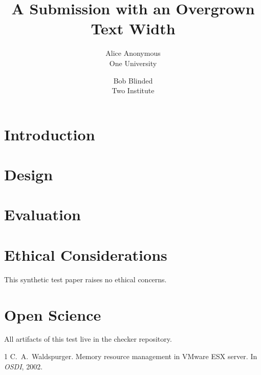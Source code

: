 \documentclass[letterpaper,twocolumn,10pt]{article}
\date{}
\title{\Large \bf A Submission with an Overgrown Text Width}
\author{{\rm Alice Anonymous}\\One University \and {\rm Bob Blinded}\\Two Institute}
\begin{document}
\maketitle

\begin{abstract}
\lipsum[1][1-5]
\end{abstract}

\section{Introduction}
\lipsum[2-20]

\section{Design}
\lipsum[21-45]

\section{Evaluation}
\lipsum[46-70]

\appendix
\section*{Ethical Considerations}
This synthetic test paper raises no ethical concerns.

\section*{Open Science}
All artifacts of this test live in the checker repository.

\begin{thebibliography}{1}
 C.~A.\ Waldspurger. Memory resource management in VMware ESX
  server. In \emph{OSDI}, 2002.
\end{thebibliography}
\end{document}

